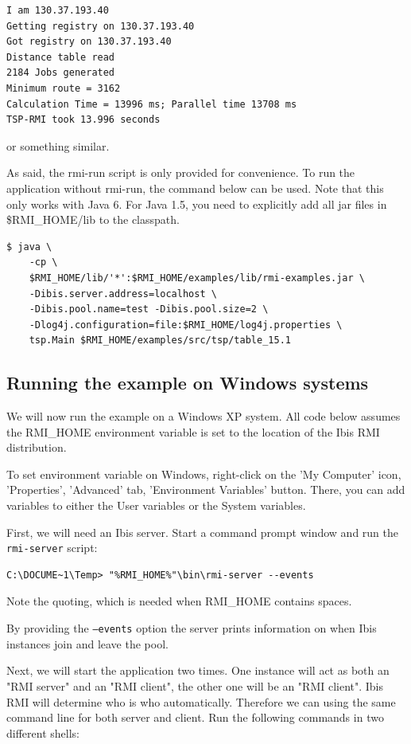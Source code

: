 \documentclass[a4paper,10pt]{article}
\begin{document}
\noindent
{\small
\begin{verbatim}
I am 130.37.193.40
Getting registry on 130.37.193.40
Got registry on 130.37.193.40
Distance table read
2184 Jobs generated
Minimum route = 3162
Calculation Time = 13996 ms; Parallel time 13708 ms
TSP-RMI took 13.996 seconds
\end{verbatim}
}
\noindent

or something similar.

As said, the rmi-run script is only provided for convenience. To run
the application without rmi-run, the command below can be used.
Note that this only works with Java 6. For Java 1.5, you need to
explicitly add all jar files in \$RMI\_HOME/lib to the classpath.

\noindent
{\small
\begin{verbatim}
$ java \
    -cp \
    $RMI_HOME/lib/'*':$RMI_HOME/examples/lib/rmi-examples.jar \
    -Dibis.server.address=localhost \
    -Dibis.pool.name=test -Dibis.pool.size=2 \
    -Dlog4j.configuration=file:$RMI_HOME/log4j.properties \
    tsp.Main $RMI_HOME/examples/src/tsp/table_15.1
\end{verbatim}
}
\noindent

\subsection{Running the example on Windows systems}

We will now run the example on a Windows XP system.
All code below assumes the RMI\_HOME
environment variable is set to the location of the Ibis RMI distribution.

To set environment variable on Windows, right-click on the 'My Computer' icon,
'Properties', 'Advanced' tab, 'Environment Variables' button. There, you
can add variables to either the User variables or the System variables.

First, we will need an Ibis server. Start a command prompt window and
run the \texttt{rmi-server} script:
\noindent
{\small
\begin{verbatim}
C:\DOCUME~1\Temp> "%RMI_HOME%"\bin\rmi-server --events
\end{verbatim}
}
\noindent

Note the quoting, which is needed when RMI\_HOME contains spaces.

By providing the \texttt{--events} option the server
prints information on when Ibis instances join and leave the pool.

Next, we will start the application two times. One instance will act as both an
"RMI server" and an "RMI client", the other one will be an "RMI client".
Ibis RMI will determine who is who automatically. Therefore we can using the
same command line for both server and client.
Run the following commands in two different shells:
\end{document}
